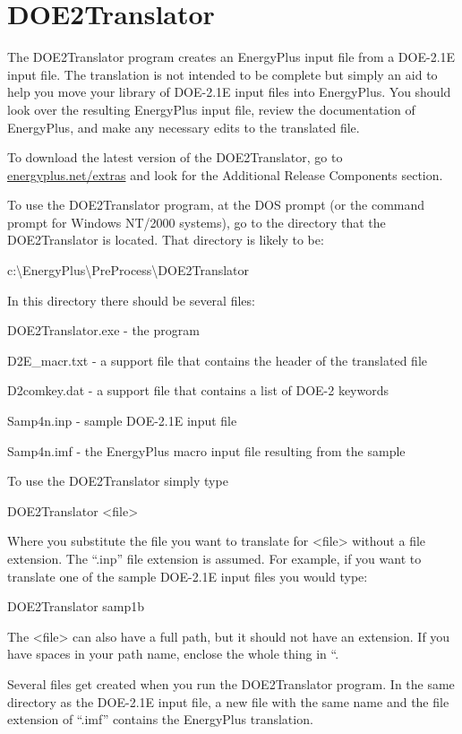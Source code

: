 \chapter{DOE2Translator}\label{doe2translator}

The DOE2Translator program creates an EnergyPlus input file from a DOE-2.1E input file. The translation is not intended to be complete but simply an aid to help you move your library of DOE-2.1E input files into EnergyPlus. You should look over the resulting EnergyPlus input file, review the documentation of EnergyPlus, and make any necessary edits to the translated file. 

To download the latest version of the DOE2Translator, go to \href{https://energyplus.net/extras}{energyplus.net/extras} and look for the Additional Release Components section.


To use the DOE2Translator program, at the DOS prompt (or the command prompt for Windows NT/2000 systems), go to the directory that the DOE2Translator is located. That directory is likely to be:

c:\textbackslash{}EnergyPlus\textbackslash{}PreProcess\textbackslash{}DOE2Translator

In this directory there should be several files:

DOE2Translator.exe - the program

D2E\_macr.txt - a support file that contains the header of the translated file

D2comkey.dat - a support file that contains a list of DOE-2 keywords

Samp4n.inp - sample DOE-2.1E input file

Samp4n.imf - the EnergyPlus macro input file resulting from the sample

To use the DOE2Translator simply type

DOE2Translator \textless{}file\textgreater{}

Where you substitute the file you want to translate for \textless{}file\textgreater{} without a file extension. The ``.inp'' file extension is assumed. For example, if you want to translate one of the sample DOE-2.1E input files you would type:

DOE2Translator samp1b

The \textless{}file\textgreater{} can also have a full path, but it should not have an extension. If you have spaces in your path name, enclose the whole thing in ``.

Several files get created when you run the DOE2Translator program. In the same directory as the DOE-2.1E input file, a new file with the same name and the file extension of ``.imf'' contains the EnergyPlus translation.

